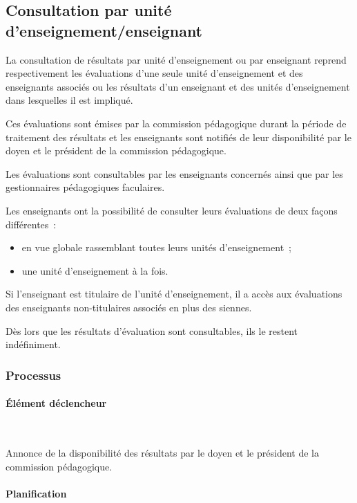 \documentclass[a4paper,11pt]{report}
\begin{document}
\subsection{Consultation par unité d'enseignement/enseignant}\label{sec:consul-ue-enseign}

La consultation de résultats par unité d'enseignement ou par enseignant reprend respectivement les évaluations d'une seule unité d'enseignement et des enseignants associés ou les résultats d'un enseignant et des unités d'enseignement dans lesquelles il est impliqué.

Ces évaluations sont émises par la commission pédagogique durant la période de traitement des résultats et les enseignants sont notifiés de leur disponibilité par le doyen et le président de la commission pédagogique.

Les évaluations sont consultables par les enseignants concernés ainsi que par les gestionnaires pédagogiques faculaires.

Les enseignants ont la possibilité de consulter leurs évaluations de deux façons différentes~:
\begin{itemize}
	\item en vue globale rassemblant toutes leurs unités d'enseignement~;
	\item une unité d'enseignement à la fois.
\end{itemize}

Si l'enseignant est titulaire de l'unité d'enseignement, il a accès aux évaluations des enseignants non-titulaires associés en plus des siennes.

Dès lors que les résultats d'évaluation sont consultables, ils le restent indéfiniment.

\subsubsection{Processus}
\paragraph{Élément déclencheur}~\newline{}

Annonce de la disponibilité des résultats par le doyen et le président de la commission pédagogique.

\paragraph{Planification}~\newline{}
\end{document}
